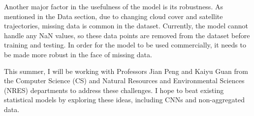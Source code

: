 \documentclass[letterpaper]{article}
\begin{document}
Another major factor in the usefulness of the model is its robustness. As mentioned in the Data section, due to changing cloud cover and satellite trajectories, missing data is common in the dataset. Currently, the model cannot handle any NaN values, so these data points are removed from the dataset before training and testing. In order for the model to be used commercially, it needs to be made more robust in the face of missing data.

This summer, I will be working with Professors Jian Peng and Kaiyu Guan from the Computer Science (CS) and Natural Resources and Environmental Sciences (NRES) departments to address these challenges. I hope to beat existing statistical models by exploring these ideas, including CNNs and non-aggregated data.



\end{document}
